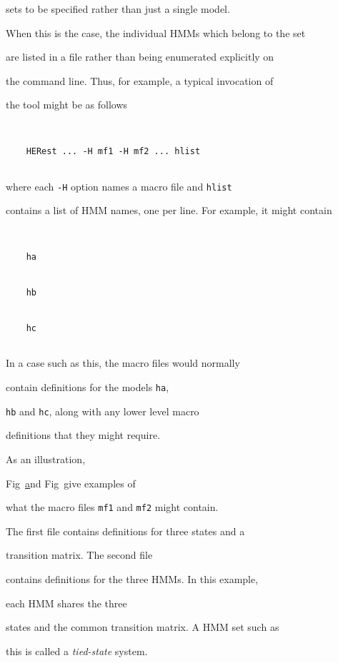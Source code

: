 sets to be specified rather than just a single model.


When this is the case, the individual HMMs which belong to the set


are listed in a file rather than being enumerated explicitly on


the command line.  Thus, for example, a typical invocation of


the tool  might be as follows


\begin{verbatim}


    HERest ... -H mf1 -H mf2 ... hlist


\end{verbatim}


where each \texttt{-H} option names a macro file and \texttt{hlist}


contains a list of HMM names, one per line. For example, it might contain


\begin{verbatim}


    ha


    hb


    hc


\end{verbatim}


In a case such as this, the macro files would normally


contain definitions for the models \texttt{ha}, 


\texttt{hb} and \texttt{hc}, along with any lower level macro 


definitions that they might require.





As an illustration,


Fig~\href{f:mac6def} and Fig~\href{f:hmm6def} give examples of


what the macro files \texttt{mf1} and \texttt{mf2} might contain.


The first file contains definitions for three states and a


transition matrix.  The second file


contains definitions for the three HMMs.  In this example,


each HMM shares the three


states and the common transition matrix.  A HMM set such as 


this is called a \textit{tied-state} system.





